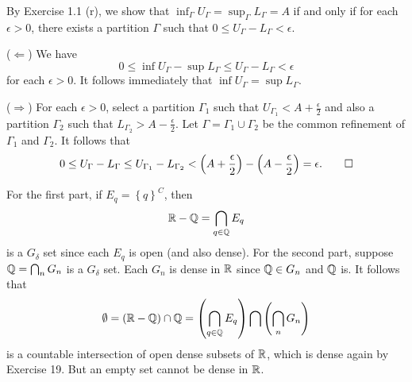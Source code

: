 
\begin{exercise}{1.15}
  By Exercise 1.1 (r),
  we show that $\inf_{\Gamma} U_\Gamma = \sup_{\Gamma} L_\Gamma = A$
  if and only if for each $\epsilon > 0$,
  there exists a partition $\Gamma$ such that $0 \le U_\Gamma - L_\Gamma < \epsilon$.

  ($\Longleftarrow$) We have
  \[
    0 \le \inf U_\Gamma - \sup L_\Gamma \le U_\Gamma - L_\Gamma < \epsilon
  \]
  for each $\epsilon > 0$.
  It follows immediately that $\inf U_\Gamma = \sup L_\Gamma$.

  ($\Longrightarrow$) For each $\epsilon > 0$,
  select a partition $\Gamma_1$ such that $U_{\Gamma_1} < A + \frac{\epsilon}{2}$
  and also a partition $\Gamma_2$ such that $L_{\Gamma_2} > A - \frac{\epsilon}{2}$.
  Let $\Gamma = \Gamma_1 \cup \Gamma_2$ be the common refinement of $\Gamma_1$ and $\Gamma_2$.
  It follows that
  \[
    0 \le U_{\Gamma} - L_{\Gamma} \le U_{\Gamma_1} - L_{\Gamma_2}
    < \left( A + \frac{\epsilon}{2} \right) - \left( A - \frac{\epsilon}{2} \right) = \epsilon.
    \qedhere
  \]
\end{exercise}

\begin{exercise}{1.20}
  For the first part, if $E_q = \left\{ q \right\}^C$, then
  \[
    \mathbb{R} - \mathbb{Q} = \bigcap_{q \in \mathbb{Q}} E_q
  \]
  is a $G_\delta$ set since each $E_q$ is open (and also dense).
  For the second part,
  suppose $\mathbb{Q} = \bigcap_n G_n$ is a $G_\delta$ set.
  Each $G_n$ is dense in $\mathbb{R}$ since $\mathbb{Q} \in G_n$ and $\mathbb{Q}$ is.
  It follows that
  \[
    \emptyset = \left( \mathbb{R} - \mathbb{Q} \right) \cap \mathbb{Q}
    = \left( \bigcap_{q \in \mathbb{Q}} E_q \right) \bigcap \left( \bigcap_n G_n \right)
  \]
  is a countable intersection of open dense subsets of $\mathbb{R}$,
  which is dense again by Exercise 19.
  But an empty set cannot be dense in $\mathbb{R}$.
\end{exercise}
